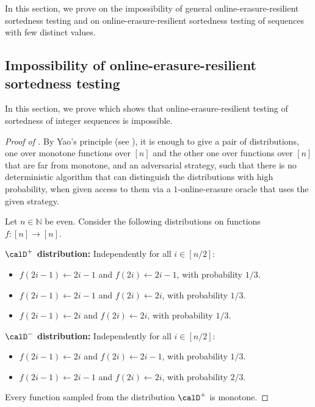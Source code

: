 \documentclass{toc}
\begin{document}
In this section, we prove  on the impossibility of general online-erasure-resilient sortedness testing and  on online-erasure-resilient sortedness testing of sequences with few distinct values. 

%
\subsection{Impossibility of online-erasure-resilient sortedness testing}

In this section, we prove  which shows that online-erasure-resilient testing of sortedness of integer sequences is impossible. 


\begin{proof}[Proof of ]
	By Yao's principle (see ), it is enough to give a pair of distributions, one over monotone functions over $[n]$ and the other one over functions over $[n]$ that are far from monotone, and an adversarial strategy, such that there is no deterministic algorithm that can distinguish the distributions with high probability, when given access to them via a $1$-online-erasure oracle that uses the given strategy. 
	
	\noindent Let $n \in \mathbb{N}$ be even. Consider the following distributions on functions $f:[n] \to [n]$. 
	\medskip
	
	\noindent\textbf{$\calD^+$ distribution:} Independently for all $i \in [n/2]$:  %
	\begin{itemize}
		\item %
		$f(2i-1) \gets 2i-1$ and $f(2i) \gets 2i -1$, with probability $1/3$.
		\item $f(2i-1) \gets 2i-1$ and $f(2i) \gets 2i$, with probability $1/3$.
		\item $f(2i-1) \gets 2i$ and $f(2i) \gets 2i$, with probability $1/3$. %
	\end{itemize}
	
	\noindent\textbf{$\calD^-$ distribution:} Independently for all $i \in [n/2]$: %
	\begin{itemize}
		\item $f(2i-1) \gets 2i$ and $f(2i) \gets 2i -1$, with probability $1/3$. %
		\item $f(2i-1) \gets 2i-1$ and $f(2i) \gets 2i$, with probability $2/3$. %
	\end{itemize}
	
	Every function sampled from the distribution  $\calD^+$ is monotone. 
	

\end{proof}
\end{document}
